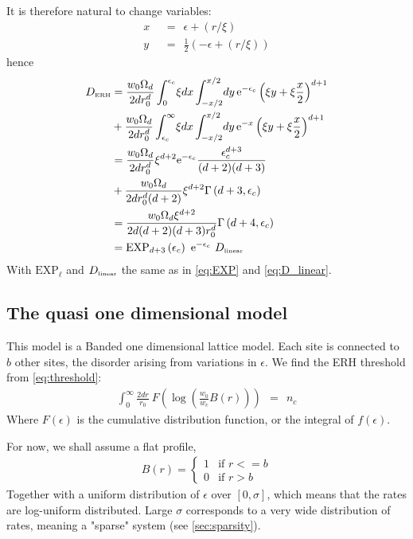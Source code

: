 It is therefore natural to change variables:
%
\begin{align}
x\ \ &= \ \ \epsilon+(r/\xi) \\
y\ \ &= \ \ \frac{1}{2}\left(-\epsilon+(r/\xi)\right) 
\end{align}
%
hence 
%
\begin{align}
D_{\tbox{ERH}} &= 
\frac{w_0\Omega_d}{2dr_0^d}\int_0^{\epsilon_c}\! \xi dx \int_{-x/2}^{x/2} \! dy \, \eexp{-\epsilon_c} \left(\xi y + \xi \frac{x}{2}\right)^{d+1} 
\nonumber \\
& + \frac{w_0\Omega_d}{2dr_0^d}\int_{\epsilon_c}^{\infty} \! \xi dx \int_{-x/2}^{x/2} \! dy \, \eexp{-x} \left(\xi y+\xi \frac{x}{2}\right)^{d+1} 
\nonumber \\
&= \frac{w_0\Omega_d}{2dr_0^d}\xi^{d+2} \eexp{-\epsilon_c} \frac{\epsilon_c^{d+3}}{(d+2)(d+3)}  
\nonumber \\
& +\frac{w_0\Omega_d}{2dr_0^d(d+2)}\xi^{d+2} \Gamma\left(d+3,\epsilon_c\right)
\nonumber \\
&= \frac{w_0\Omega_d \xi^{d+2}}{2d(d+2)(d+3)r_0^d}\Gamma\left(d+4,\epsilon_c\right) \nonumber\\
&=\mathrm{EXP}_{d{+}3}\left(\epsilon_c\right)  \  \eexp{-\epsilon_c}  \ D_{\tbox{linear}}
\end{align}
%
With $\mathrm{EXP}_\ell$ and $D_{\mbox{\tiny linear}}$ the same as in 
\autoref{eq:EXP} and \autoref{eq:D_linear}.




\subsection{The quasi one dimensional model}\label{sec:quasi_oned}

This model is a Banded one dimensional lattice model. Each site 
is connected to $b$ other sites, the disorder arising from
variations in $\epsilon$. 
We find the ERH threshold from \autoref{eq:threshold}:
%
\begin{align}\label{eq:thres_banded}
\int_0^{\infty}  
\frac{2 dr}{r_0} 
\ F\left(\log\left(\frac{w_0}{w_c}B(r)\right)\right) 
\ \ = \ \ n_c
\end{align}
%
Where $F(\epsilon)$ is the cumulative distribution function, or the integral of $f(\epsilon)$.


For now, we shall assume a flat profile,
%
\begin{align}
B(r) = \begin{cases}
1 & \text{if } r <= b \\
0 & \text{if } r>b
\end{cases}
\end{align}
%
Together with a uniform distribution of $\epsilon$ over $[0,\sigma]$, which means that the rates are log-uniform distributed. Large $\sigma$ corresponds 
to a very wide distribution of rates, meaning a "sparse" system (see 
\autoref{sec:sparsity}).

